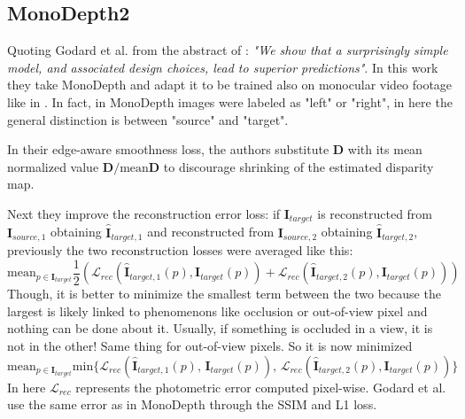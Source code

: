 \subsection{MonoDepth2}
Quoting Godard et al. from the abstract of \cite{MonoDepth2}: \textit{"We show that a surprisingly simple model, and associated design choices, lead to superior predictions"}.
In this work they take MonoDepth \cite{MonoDepth} and adapt it to be trained also on monocular video footage like in \cite{SfMLearner}.
In fact, in MonoDepth images were labeled as "left" or "right", in here the general distinction is between "source" and "target".

In their edge-aware smoothness loss, the authors substitute $\mathbf{D}$ with its mean normalized value $\mathbf{D} / \text{mean} \mathbf{D}$ to discourage shrinking of the estimated disparity map.

Next they improve the reconstruction error loss: if $\mathbf{I}_{target}$ is reconstructed from $\mathbf{I}_{source, 1}$ obtaining $\hat{\mathbf{I}}_{target, 1}$ and reconstructed from $\mathbf{I}_{source, 2}$ obtaining $\hat{\mathbf{I}}_{target, 2}$, previously the two reconstruction losses were averaged like this:
\[
	\text{mean}_{p \in \mathbf{I}_{target}} \frac{1}{2}(\mathcal{L}_{rec}(\hat{\mathbf{I}}_{target, 1}(p), \mathbf{I}_{target}(p)) + \mathcal{L}_{rec}(\hat{\mathbf{I}}_{target, 2}(p), \mathbf{I}_{target}(p)))
\]
Though, it is better to minimize the smallest term between the two because the largest is likely linked to phenomenons like occlusion or out-of-view pixel and nothing can be done about it.
Usually, if something is occluded in a view, it is not in the other!
Same thing for out-of-view pixels.
So it is now minimized
\[
	\text{mean}_{p \in \mathbf{I}_{target}} \text{min} \{ \mathcal{L}_{rec}(\hat{\mathbf{I}}_{target, 1}(p), \, \mathbf{I}_{target}(p)), \, \mathcal{L}_{rec}(\hat{\mathbf{I}}_{target, 2}(p), \mathbf{I}_{target}(p)) \}
\]
In here $\mathcal{L}_{rec}$ represents the photometric error computed pixel-wise.
Godard et al. use the same error as in MonoDepth through the SSIM and L1 loss.

